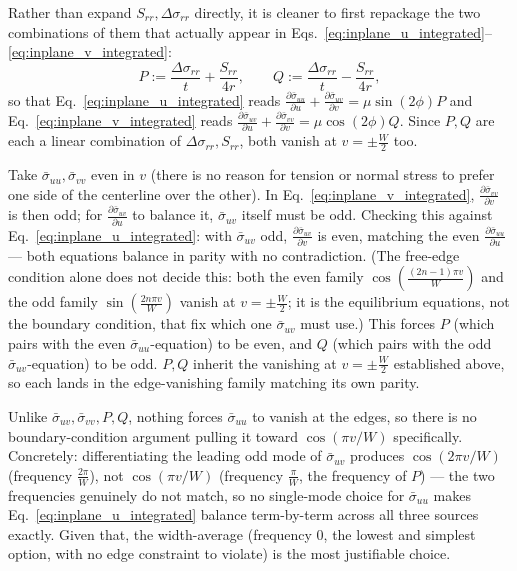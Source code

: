 \documentclass[11pt]{article}
\begin{document}
Rather than expand $S_{rr},\Delta\sigma_{rr}$ directly, it is cleaner to first repackage the two combinations of them that actually appear in Eqs.~\eqref{eq:inplane_u_integrated}--\eqref{eq:inplane_v_integrated}:
\begin{equation}\label{eq:PQ_def}
    P := \frac{\Delta\sigma_{rr}}{t}+\frac{S_{rr}}{4r}, \qquad Q := \frac{\Delta\sigma_{rr}}{t}-\frac{S_{rr}}{4r},
\end{equation}
so that Eq.~\eqref{eq:inplane_u_integrated} reads $\frac{\partial\bar\sigma_{uu}}{\partial u}+\frac{\partial\bar\sigma_{uv}}{\partial v}=\mu\sin(2\phi)P$ and Eq.~\eqref{eq:inplane_v_integrated} reads $\frac{\partial\bar\sigma_{uv}}{\partial u}+\frac{\partial\bar\sigma_{vv}}{\partial v}=\mu\cos(2\phi)Q$. Since $P,Q$ are each a linear combination of $\Delta\sigma_{rr},S_{rr}$, both vanish at $v=\pm\frac W2$ too.

Take $\bar\sigma_{uu},\bar\sigma_{vv}$ even in $v$ (there is no reason for tension or normal stress to prefer one side of the centerline over the other). In Eq.~\eqref{eq:inplane_v_integrated}, $\frac{\partial\bar\sigma_{vv}}{\partial v}$ is then odd; for $\frac{\partial\bar\sigma_{uv}}{\partial u}$ to balance it, $\bar\sigma_{uv}$ itself must be odd. Checking this against Eq.~\eqref{eq:inplane_u_integrated}: with $\bar\sigma_{uv}$ odd, $\frac{\partial\bar\sigma_{uv}}{\partial v}$ is even, matching the even $\frac{\partial\bar\sigma_{uu}}{\partial u}$ --- both equations balance in parity with no contradiction. (The free-edge condition alone does not decide this: both the even family $\cos\!\left(\frac{(2n-1)\pi v}{W}\right)$ and the odd family $\sin\!\left(\frac{2n\pi v}{W}\right)$ vanish at $v=\pm\frac W2$; it is the equilibrium equations, not the boundary condition, that fix which one $\bar\sigma_{uv}$ must use.) This forces $P$ (which pairs with the even $\bar\sigma_{uu}$-equation) to be even, and $Q$ (which pairs with the odd $\bar\sigma_{uv}$-equation) to be odd. $P,Q$ inherit the vanishing at $v=\pm\frac W2$ established above, so each lands in the edge-vanishing family matching its own parity.

Unlike $\bar\sigma_{uv},\bar\sigma_{vv},P,Q$, nothing forces $\bar\sigma_{uu}$ to vanish at the edges, so there is no boundary-condition argument pulling it toward $\cos(\pi v/W)$ specifically. Concretely: differentiating the leading odd mode of $\bar\sigma_{uv}$ produces $\cos(2\pi v/W)$ (frequency $\frac{2\pi}{W}$), not $\cos(\pi v/W)$ (frequency $\frac\pi W$, the frequency of $P$) --- the two frequencies genuinely do not match, so no single-mode choice for $\bar\sigma_{uu}$ makes Eq.~\eqref{eq:inplane_u_integrated} balance term-by-term across all three sources exactly. Given that, the width-average (frequency $0$, the lowest and simplest option, with no edge constraint to violate) is the most justifiable choice. 
\end{document}
